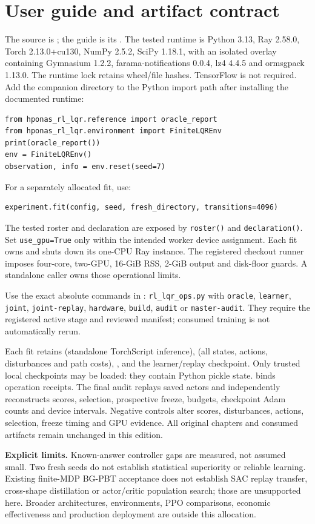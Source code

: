 \section{User guide and artifact contract}
The source is ; the guide is its .
The tested runtime is Python 3.13, Ray 2.58.0, Torch 2.13.0+cu130, NumPy 2.5.2,
SciPy 1.18.1, with an isolated overlay containing Gymnasium 1.2.2,
farama-notifications 0.0.4, lz4 4.4.5 and ormsgpack 1.13.0. The runtime lock
retains wheel/file hashes. TensorFlow is not required. Add the companion
directory to the Python import path after installing the documented runtime:
\begin{Verbatim}[fontsize=\small]
from hponas_rl_lqr.reference import oracle_report
from hponas_rl_lqr.environment import FiniteLQREnv
print(oracle_report())
env = FiniteLQREnv()
observation, info = env.reset(seed=7)
\end{Verbatim}
For a separately allocated fit, use:
\begin{Verbatim}[fontsize=\small]
experiment.fit(config, seed, fresh_directory, transitions=4096)
\end{Verbatim}
The tested roster and declaration are exposed by \texttt{roster()} and
\texttt{declaration()}. Set \texttt{use\_gpu=True} only within the intended
worker device assignment. Each fit owns and shuts down its one-CPU Ray instance.
The registered checkout runner imposes four-core, two-GPU, 16-GiB RSS, 2-GiB
output and disk-floor guards. A standalone caller owns those operational limits.

Use the exact absolute commands in :
\texttt{rl\_lqr\_ops.py} with \texttt{oracle}, \texttt{learner},
\texttt{joint}, \texttt{joint-replay}, \texttt{hardware}, \texttt{build},
\texttt{audit} or \texttt{master-audit}. They require the registered active
stage and reviewed manifest; consumed training is not automatically rerun.

Each fit retains  (standalone TorchScript inference),
 (all states, actions, disturbances and path costs),
,  and the learner/replay checkpoint.
Only trusted local checkpoints may be loaded: they contain Python pickle state.
 binds operation receipts. The final audit replays
saved actors and independently reconstructs scores, selection, prospective
freeze, budgets, checkpoint Adam counts and device intervals. Negative controls
alter scores, disturbances, actions, selection, freeze timing and GPU evidence.
All original chapters and consumed artifacts remain unchanged in this edition.

\begin{decisions}
\textbf{Explicit limits.} Known-answer controller gaps are measured, not assumed
small. Two fresh seeds do not establish statistical superiority or reliable
learning. Existing finite-MDP BG-PBT acceptance does not establish SAC replay
transfer, cross-shape distillation or actor/critic population search; those are
unsupported here. Broader architectures, environments, PPO comparisons,
economic effectiveness and production deployment are outside this allocation.
\end{decisions}
